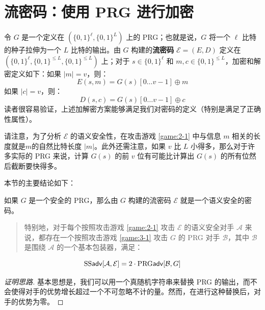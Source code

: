 \section{流密码：使用 PRG 进行加密}

令 $G$ 是一个定义在 $(\{0,1\}^\ell,\{0,1\}^L)$ 上的 PRG；也就是说，$G$ 将一个 $\ell$ 比特的种子拉伸为一个 $L$ 比特的输出。由 $G$ 构建的\textbf{流密码} $\mathcal E=(E,D)$ 定义在 $(\{0,1\}^\ell,\{0,1\}^{\leq L},\{0,1\}^{\leq L})$ 上；对于 $s\in\{0,1\}^\ell$ 和 $m,c\in\{0,1\}^{\leq L}$，加密和解密定义如下：如果 $|m|=v$，则：
$$
E(s,m)=G(s)[0\dots v-1]\oplus m
$$
如果 $|c| = v$，则：
$$
D(s,c)=G(s)[0\dots v-1]\oplus c
$$
读者很容易验证，上述加解密方案能够满足我们对密码的定义（特别是满足了正确性属性）。

请注意，为了分析 $\mathcal E$ 的语义安全性，在攻击游戏 \ref{game:2-1} 中与信息 $m$ 相关的长度就是$m$的自然比特长度 $|m|$。此外还需注意，如果 $v$ 比 $L$ 小得多，那么对于许多实际的 PRG 来说，计算 $G(s)$ 的前 $v$ 位有可能比计算出 $G(s)$ 的所有位然后截断要快得多。

本节的主要结论如下：

\begin{theorem}\label{theo:3-1}
如果 $G$ 是一个安全的 PRG，那么由 $G$ 构建的流密码 $\mathcal E$ 就是一个语义安全的密码。
\begin{quote}
特别地，对于每个按照攻击游戏 \ref{game:2-1} 攻击 $\mathcal E$ 的语义安全对手 $\mathcal A$ 来说，都存在一个按照攻击游戏 \ref{game:3-1} 攻击 $G$ 的 PRG 对手 $\mathcal B$，其中 $\mathcal B$ 是围绕 $\mathcal A$ 的一个基本包装器，满足：
\end{quote}
\begin{equation}\label{eq:3-2}
{\rm SS\mathsf{adv}}[\mathcal{A},\mathcal{E}]=2\cdot{\rm PRG\mathsf{adv}}[\mathcal{B},G]
\end{equation}
\end{theorem}

\begin{proof}[证明思路]
基本思想是，我们可以用一个真随机字符串来替换 PRG 的输出，而不会使得对手的优势增长超过一个不可忽略不计的量。然而，在进行这种替换后，对手的优势为零。
\end{proof}

